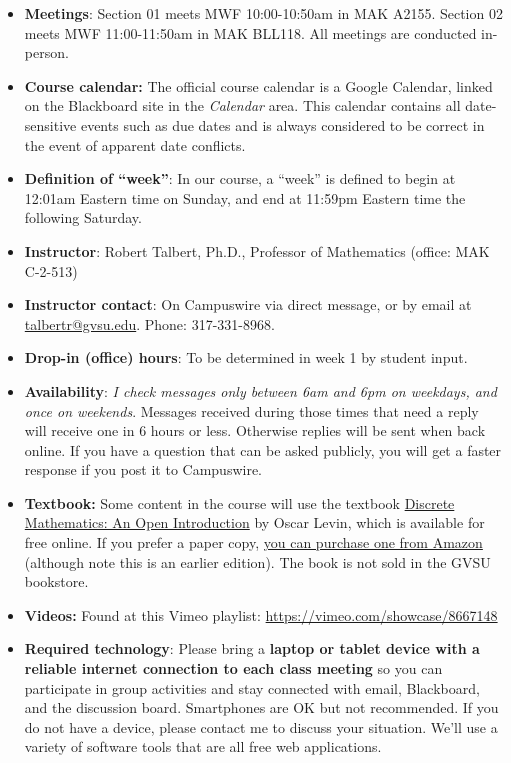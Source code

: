 \documentclass[]{article}
\providecommand{\tightlist}{%
  \setlength{\itemsep}{0pt}\setlength{\parskip}{0pt}}
\begin{document}
\begin{tcolorbox}[title=Course Information, colback=green!15!white]


\begin{itemize}
\tightlist
    \item \textbf{Meetings}:  Section 01 meets MWF 10:00-10:50am in MAK A2155. Section 02 meets MWF 11:00-11:50am in MAK BLL118. All meetings are conducted in-person. 
    \item \textbf{Course calendar:} The official course calendar is a Google Calendar, linked on the Blackboard site in the \textit{Calendar} area. This calendar  contains all date-sensitive events such as due dates and is always considered to be correct in the event of apparent date conflicts. 
    \item \textbf{Definition of ``week''}: In our course, a ``week'' is defined to begin at 12:01am Eastern time on Sunday, and end at 11:59pm Eastern time the following Saturday. 
    \item \textbf{Instructor}: Robert Talbert, Ph.D., Professor of Mathematics (office: MAK C-2-513)
    \item \textbf{Instructor contact}: On Campuswire via direct message, or by email at \url{talbertr@gvsu.edu}. Phone: 317-331-8968. 
    \item \textbf{Drop-in (office) hours}: To be determined in week 1 by student input.
    \item \textbf{Availability}: \textit{I check messages only between 6am and 6pm on weekdays, and once on weekends}. Messages received during those times that need a reply will receive one in 6 hours or less. Otherwise replies will be sent when back online. If you have a question that can be asked publicly, you will get a faster response if you post it to Campuswire.
    \item \textbf{Textbook:} Some content in the course will use the textbook \href{http://discretetext.oscarlevin.com/dmoi/}{Discrete Mathematics: An Open Introduction} by Oscar Levin, which is available for free online. If you prefer a paper copy, \href{https://www.amazon.com/gp/product/1516921186}{you can purchase one from Amazon} (although note this is an earlier edition). The book is not sold in the GVSU bookstore. 
    \item \textbf{Videos:} Found at this Vimeo playlist:  \href{https://vimeo.com/showcase/8667148}{https://vimeo.com/showcase/8667148}
    \item \textbf{Required technology}: Please bring a \textbf{laptop or tablet device with a reliable internet connection to each class meeting} so you can participate in group activities and stay connected with email, Blackboard, and the discussion board. Smartphones are OK but not recommended. If you do not have a device, please contact me to discuss your situation. We'll use a variety of software tools that are all free web applications. 
\end{itemize}
\end{tcolorbox}
\end{document}
